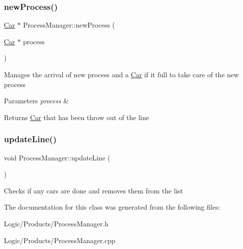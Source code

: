 \subsubsection{\texorpdfstring{newProcess()}{newProcess()}}
{\footnotesize\ttfamily \mbox{\hyperlink{class_car}{Car}} $\ast$ Process\+Manager\+::new\+Process (\begin{DoxyParamCaption}\item[{\mbox{\hyperlink{class_car}{Car}} $\ast$}]{process }\end{DoxyParamCaption})}

Manages the arrival of new process and a \mbox{\hyperlink{class_car}{Car}} if it full to take care of the new process 
\begin{DoxyParams}{Parameters}
{\em process} & \\
\hline
\end{DoxyParams}
\begin{DoxyReturn}{Returns}
\mbox{\hyperlink{class_car}{Car}} that has been throw out of the line 
\end{DoxyReturn}
\mbox{\label{class_process_manager_a2f02ec25277925232289f75930d35a21}} 
\subsubsection{\texorpdfstring{updateLine()}{updateLine()}}
{\footnotesize\ttfamily void Process\+Manager\+::update\+Line (\begin{DoxyParamCaption}{ }\end{DoxyParamCaption})}

Checks if any cars are done and removes them from the list 

The documentation for this class was generated from the following files\+:\begin{DoxyCompactItemize}
\item 
Logic/\+Products/Process\+Manager.\+h\item 
Logic/\+Products/Process\+Manager.\+cpp\end{DoxyCompactItemize}

